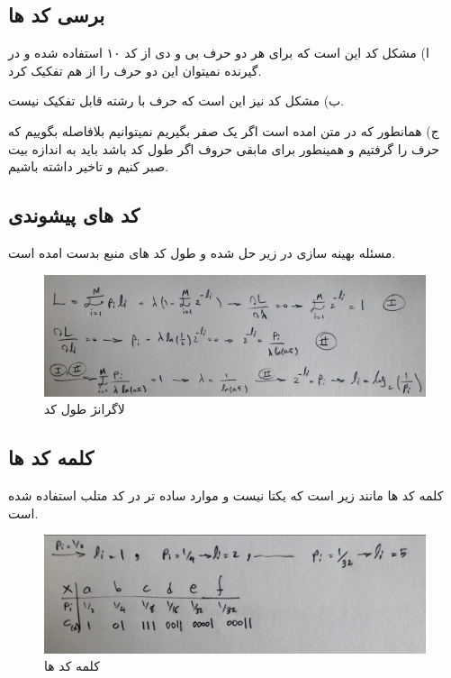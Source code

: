 \documentclass[10pt]{article}
\begin{document}
	 \subsection{برسی کد ها}
	 \par
	ا) مشکل کد 
	 این است که برای هر دو حرف بی و دی از کد ۱۰ استفاده شده و در گیرنده نمیتوان این دو حرف را از هم تفکیک کرد.
	 
	 \par
	 \noindent
	 ب) مشکل کد 
	نیز این است که حرف 
	 با رشته 
	 قابل تفکیک نیست.
	 \par
	 \noindent
	 ج) همانطور که در متن امده است اگر یک صفر بگیریم نمیتوانیم بلافاصله بگوییم که حرف 
	 را گرفتیم و همینطور برای مابقی حروف اگر طول کد 
	 باشد باید به اندازه 
	 بیت صبر کنیم و تاخیر داشته باشیم.
	 
	 \subsection{کد های پیشوندی}
	 مسئله بهینه سازی در زیر حل شده و طول کد های منبع بدست امده است.
	 
	 \begin{figure}[H]
	 	\centering
	 	\includegraphics[width=0.9\linewidth]{../img/5.2}
	 	\caption{لاگرانژ طول کد}
	 	\label{fig:5-2}
	 \end{figure}
 
 	\subsection{کلمه کد ها}
 	کلمه کد ها مانند زیر است که یکتا نیست و موارد ساده تر در کد متلب استفاده شده است.
 	 \begin{figure}[H]
 		\centering
 		\includegraphics[width=0.9\linewidth]{../img/5.3}
 		\caption{کلمه کد ها}
 		\label{fig:5-3}
 	\end{figure}
 	
\end{document}
